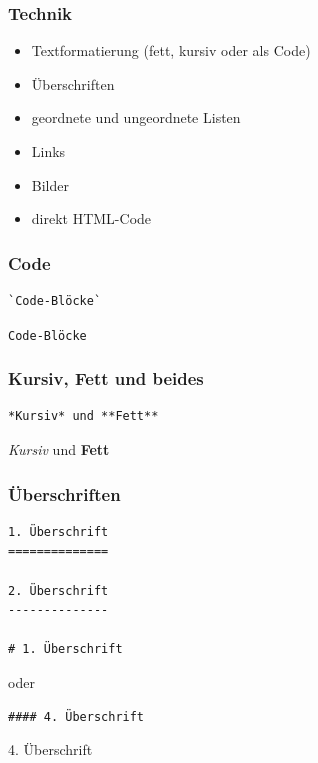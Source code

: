 \begin{frame}\frametitle{Technik}

\begin{itemize}
\item
  Textformatierung (fett, kursiv oder als Code)
\item
  Überschriften
\item
  geordnete und ungeordnete Listen
\item
  Links
\item
  Bilder
\item
  direkt HTML-Code
\end{itemize}

\end{frame}

\begin{frame}[fragile]\frametitle{Code}

\begin{verbatim}
`Code-Blöcke`
\end{verbatim}

\texttt{Code-Blöcke}

\end{frame}

\begin{frame}[fragile]\frametitle{Kursiv, Fett und beides}

\begin{verbatim}
*Kursiv* und **Fett**
\end{verbatim}

\emph{Kursiv} und \textbf{Fett}

\end{frame}

\begin{frame}[fragile]\frametitle{Überschriften}

\begin{verbatim}
1. Überschrift
==============

2. Überschrift
--------------

# 1. Überschrift
\end{verbatim}

oder

\begin{verbatim}
#### 4. Überschrift
\end{verbatim}

\begin{block}{4. Überschrift}

\end{block}

\end{frame}

